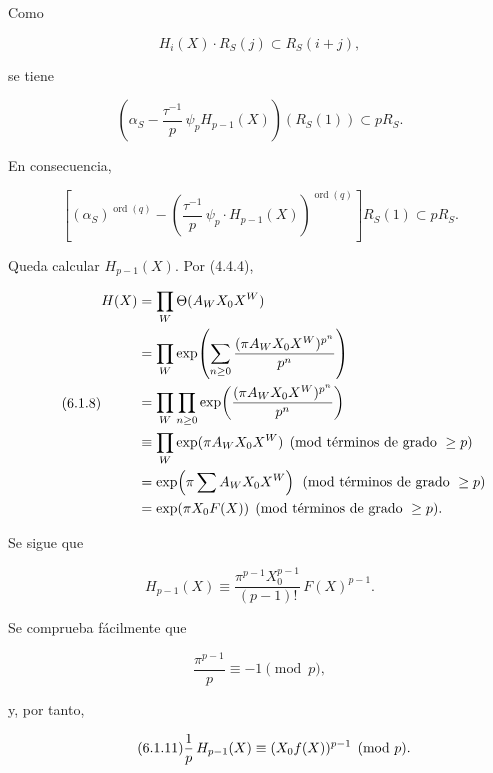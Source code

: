 Como

\begin{equation}\tag{6.1.5}
H_i(X)\cdot R_S(j)\subset R_S(i+j),
\end{equation}

se tiene

\begin{equation}\tag{6.1.6}
\left(
\alpha_S-\frac{\tau^{-1}}p\,\psi_pH_{p-1}(X)
\right)(R_S(1))
\subset pR_S.
\end{equation}

En consecuencia,

\begin{equation}\tag{6.1.7}
\left[
(\alpha_S)^{\operatorname{ord}(q)}
-\left(
\frac{\tau^{-1}}p\,\psi_p\cdot H_{p-1}(X)
\right)^{\operatorname{ord}(q)}
\right]R_S(1)
\subset pR_S.
\end{equation}

Queda calcular $H_{p-1}(X)$. Por (4.4.4),

\pageoriginale

\begin{equation}\tag{6.1.8}
\begin{aligned}
H(X)
&=\prod_W\Theta(A_WX_0X^W)\\
&=\prod_W\exp\!\left(
\sum_{n\geq0}\frac{\sisi{}{(}\pi A_WX_0X^W)^{p^n}}{p^n}
\right)\\
&=\prod_W\prod_{n\geq0}
\exp\!\left(\frac{(\pi A_WX_0X^W)^{p^n}}{p^n}\right)\\
&\equiv\prod_W\exp(\pi A_WX_0X^W)
\pmod{\text{términos de grado }\geq p}\\
&=\exp\!\left(\pi\sum A_WX_0X^W\right)
\pmod{\text{términos de grado }\geq p}\\
&=\exp(\pi X_0F(X))
\pmod{\text{términos de grado }\geq p}.
\end{aligned}
\end{equation}

Se sigue que

\begin{equation}\tag{6.1.9}
H_{p-1}(X)
\equiv\frac{\pi^{p-1}X_0^{p-1}}{(p-1)!}\,F(X)^{p-1}.
\end{equation}

Se comprueba fácilmente que

\begin{equation}\tag{6.1.10}
\frac{\pi^{p-1}}p\equiv-1\pmod p,
\end{equation}

y, por tanto,

\begin{equation}\tag{6.1.11}
\frac1p\,H_{p-1}(X)
\equiv\sisi{(X_0f(X)^{p-1}}{(X_0f(X))^{p-1}}\pmod p.
\end{equation}


